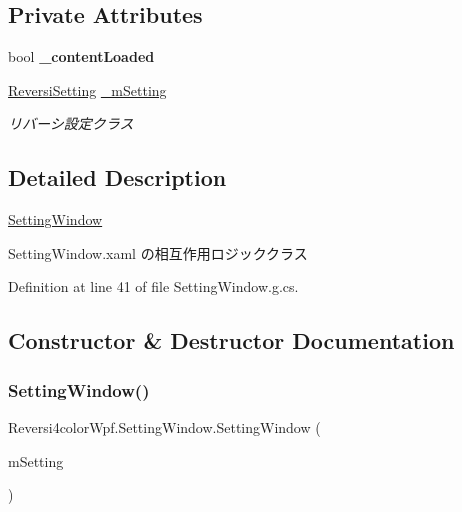 \subsection*{Private Attributes}
\begin{DoxyCompactItemize}
\item 
\mbox{\label{class_reversi4color_wpf_1_1_setting_window_a198f043082d96c0fdd7bc267111d81af}} 
bool {\bfseries \+\_\+content\+Loaded}
\item 
\mbox{\label{class_reversi4color_wpf_1_1_setting_window_ae041a59dd82596f0343da6516818ef79}} 
\hyperlink{class_reversi4color_wpf_1_1_reversi_setting}{Reversi\+Setting} \hyperlink{class_reversi4color_wpf_1_1_setting_window_ae041a59dd82596f0343da6516818ef79}{\+\_\+m\+Setting}
\begin{DoxyCompactList}\small\item\em リバーシ設定クラス \end{DoxyCompactList}\end{DoxyCompactItemize}


\subsection{Detailed Description}
\hyperlink{class_reversi4color_wpf_1_1_setting_window}{Setting\+Window} 

Setting\+Window.\+xaml の相互作用ロジッククラス

Definition at line 41 of file Setting\+Window.\+g.\+cs.



\subsection{Constructor \& Destructor Documentation}
\mbox{\label{class_reversi4color_wpf_1_1_setting_window_ae883aa7c069151f5115dfc35f30aa81c}} 
\subsubsection{\texorpdfstring{Setting\+Window()}{SettingWindow()}}
{\footnotesize\ttfamily Reversi4color\+Wpf.\+Setting\+Window.\+Setting\+Window (\begin{DoxyParamCaption}\item[{\hyperlink{class_reversi4color_wpf_1_1_reversi_setting}{Reversi\+Setting}}]{m\+Setting }\end{DoxyParamCaption})}




